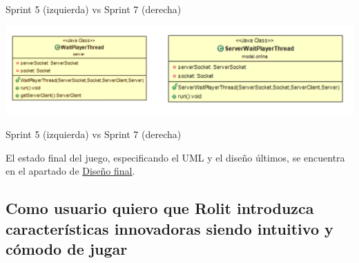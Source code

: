 \documentclass[../DocumentoOficial.tex]{subfiles}
\begin{document}
\begin{sprint}[7]
\begin{center}
Sprint 5 (izquierda) vs Sprint 7 (derecha)
\end{center}

\begin{center}
\includegraphics[scale=0.3]{WaitPlayerThread-evol.png} 

Sprint 5 (izquierda) vs Sprint 7 (derecha)
\end{center}

El estado final del juego, especificando el UML y el diseño últimos, se encuentra en el apartado de \hyperref[ch:DisenyoFinal]{Diseño final}.

\end{sprint}

\newpage

\subsection{Como usuario quiero que Rolit introduzca características innovadoras siendo intuitivo y cómodo de jugar}
\end{document}
